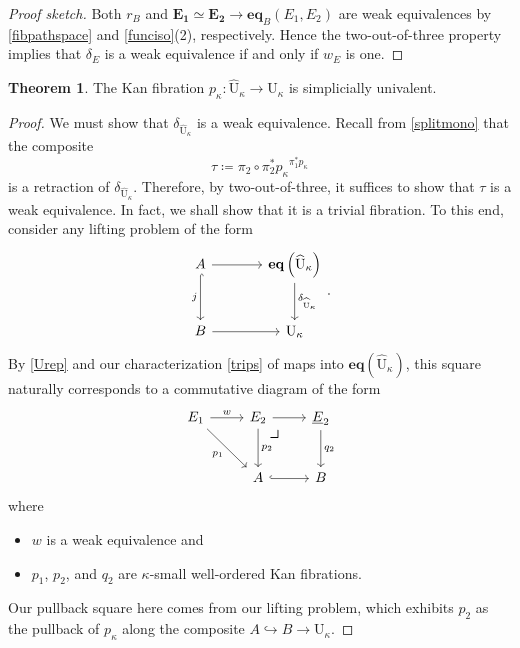 \documentclass[10pt,letterpaper,cm]{nupset}
\theoremstyle{definition}
\theoremstyle{theorem}
\newtheorem{theorem}[definition]{Theorem}
\theoremstyle{remark}
\newcommand{\0}{\mathbf{0}}
\newcommand{\1}{\mathbf{1}}
\newcommand{\2}{\mathbf{2}}
\newcommand{\bi}{\begin{itemize}}
\newcommand{\ei}{\end{itemize}}
\begin{document}
\begin{proof}[Proof sketch]
\medskip

Both $r_B$ and $\mathbf{E_1 \simeq E_2} \to \mathbf{eq}_B(E_1,E_2)$ are weak equivalences by \cref{fibpathspace} and \cref{funciso}(2), respectively. Hence the two-out-of-three property implies that $\delta_E$ is a weak equivalence if and only if $w_E$ is one. 
\end{proof}

\medskip

\begin{theorem}
The Kan fibration $p_{\kappa} : \widehat{\mathrm{U}}_{\kappa} \to \mathrm{U}_{\kappa}$ is simplicially univalent. %
\end{theorem}
\begin{proof}
We must show that $\delta_{\widehat{\mathrm{U}}_{\kappa}}$ is a weak equivalence. Recall from \eqref{splitmono} that the composite 
$$\tau \coloneqq \pi_2\circ \pi_2^{\ast}{p_{\kappa}}^{\pi_1^{\ast}{p_{\kappa}}}$$ is a retraction of $\delta_{\widehat{\mathrm{U}}_{\kappa}}$. Therefore, by two-out-of-three, it suffices to show that $\tau$ is a weak equivalence. In fact, we shall show that it is a trivial fibration. To this end, consider any lifting problem of the form
\[
\begin{tikzcd}[row sep=large, column sep=large]
A \arrow[r] \arrow[d, "j"', hook] & \mathbf{eq}\left(\widehat{\mathrm{U}}_{\kappa}\right) \arrow[d, "\delta_{\widehat{\mathrm{U}}_{\kappa}}"] \\
B \arrow[r]                       & \mathrm{U}_{\kappa}                                                                                      
\end{tikzcd}
.\]
By \cref{Urep} and our characterization \eqref{trips} of maps into $\mathbf{eq}\left(\widehat{\mathrm{U}}_{\kappa}\right)$, this square naturally corresponds  to a commutative diagram of the form 
\[
\begin{tikzcd}[row sep=large]
E_1 \arrow[r, "w"] \arrow[rd, "p_1"'] & E_2 \arrow[d, "p_2"] \arrow[r] \arrow[dr, phantom, "\scalebox{1.5}{\color{black}$\lrcorner$}" , very near start, color=black]
& \underline{E}_2 \arrow[d, "q_2"] \\
                                      & A \arrow[r, hook]               & B                   
\end{tikzcd}
\] where
\bi
\item $w$ is a weak equivalence and 
\item $p_1$, $p_2$, and $q_2$ are $\kappa$-small well-ordered Kan fibrations.
\ei Our pullback square here comes from our lifting problem, which exhibits $p_2$ as the pullback of $p_{\kappa}$ along the composite $A \hookrightarrow B \to \mathrm{U}_{\kappa}$.


\end{proof}
\end{document}
